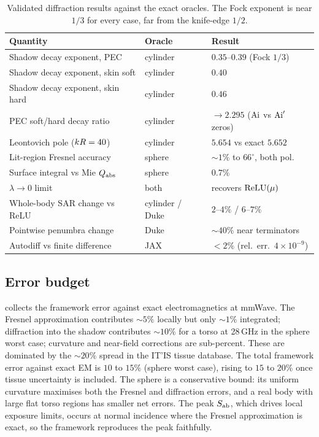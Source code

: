 \begin{table}[ht]
\centering
\caption{Validated diffraction results against the exact oracles. The Fock
exponent is near $1/3$ for every case, far from the knife-edge $1/2$.}
\label{tab:val-diffraction}
\begin{threeparttable}
\begin{tabular}{@{}lll@{}}
\toprule
Quantity & Oracle & Result \\
\midrule
Shadow decay exponent, PEC      & cylinder & $0.35$--$0.39$ (Fock $1/3$) \\
Shadow decay exponent, skin soft & cylinder & $0.40$ \\
Shadow decay exponent, skin hard & cylinder & $0.46$ \\
PEC soft/hard decay ratio       & cylinder & $\to 2.295$ ($\operatorname{Ai}$ vs $\operatorname{Ai}'$ zeros) \\
Leontovich pole ($kR = 40$) & cylinder & $5.654$ vs exact $5.652$ \\
Lit-region Fresnel accuracy     & sphere   & $\sim 1\%$ to $66^\circ$, both pol. \\
Surface integral vs Mie $Q_{\mathrm{abs}}$ & sphere   & $0.7\%$ \\
$\lambda\to 0$ limit            & both     & recovers $\operatorname{ReLU}(\mu)$ \\
Whole-body SAR change vs ReLU   & cylinder / Duke & $2$--$4\%$ / $6$--$7\%$ \\
Pointwise penumbra change       & Duke     & $\sim 40\%$ near terminators \\
Autodiff vs finite difference   & JAX      & $<2\%$ (rel.\ err.\ $4\times 10^{-9}$) \\
\bottomrule
\end{tabular}
\end{threeparttable}
\end{table}

\subsection{Error budget}
\label{sec:val-budget}

 collects the framework error against exact electromagnetics
at mmWave. The Fresnel approximation contributes $\sim 5\%$ locally but only
$\sim 1\%$ integrated; diffraction into the shadow contributes $\sim 10\%$ for a
torso at 28\,GHz in the sphere worst case; curvature and near-field corrections
are sub-percent. These are dominated by the $\sim 20\%$ spread in the IT'IS
tissue database. The total framework error against exact EM is $10$ to $15\%$
(sphere worst case), rising to $15$ to $20\%$ once tissue uncertainty is
included. The sphere is a conservative bound: its uniform curvature maximises
both the Fresnel and diffraction errors, and a real body with large flat torso
regions has smaller net errors. The peak $S_{\mathrm{ab}}$, which drives local exposure
limits, occurs at normal incidence where the Fresnel approximation is exact, so
the framework reproduces the peak faithfully.

